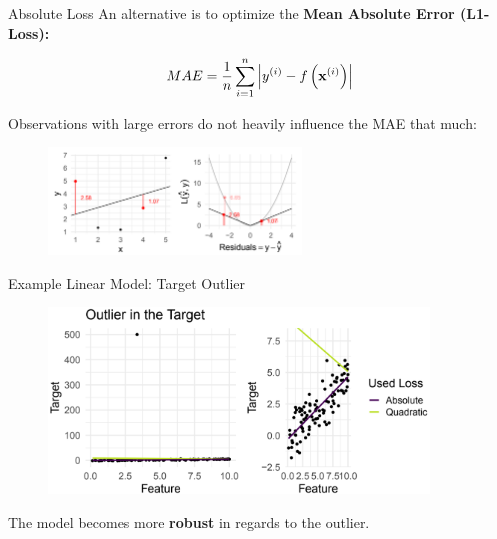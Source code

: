 \begin{vbframe}{Absolute Loss}
    An alternative is to optimize the \textbf{Mean Absolute Error (L1-Loss):}
    \vspace{+.4cm}
    
    $$
        MAE = \frac{1}{n} \sum\limits_{i = 1}^n \left|y^{(i)} - f\left(\mathbf{x}^{(i)}\right)\right|
    $$
    \vspace{+.4cm}
    
    Observations with large errors do not heavily influence the MAE that much:
    \medskip
    
    \begin{figure}
        \includegraphics[width = 0.6\textwidth]{figure_man/absolute-loss.png}
    \end{figure}
    
\end{vbframe}

\begin{vbframe}{Example Linear Model: Target Outlier}
    
    \begin{figure}
        \includegraphics[width = 0.9\textwidth]{figure_man/linear-model05.png}
    \end{figure}
    
    \medskip
    
    The model becomes more \textbf{robust} in regards to the outlier.
\end{vbframe}

